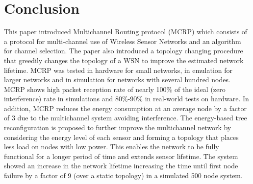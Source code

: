 \section{Conclusion}
\label{Conclusion}

This paper introduced Multichannel Routing protocol (MCRP) which consists of a protocol for multi-channel use of Wireless Sensor Networks and an algorithm for channel selection. The paper also introduced a topology changing procedure that greedily changes the topology of a WSN to improve the estimated network lifetime.  MCRP was tested in hardware for small networks, in emulation for larger networks and in simulation for networks with several hundred nodes.  MCRP shows high packet reception rate of nearly 100\% of the ideal (zero interference) rate in simulations and 80\%-90\% in real-world tests on hardware. In addition, MCRP reduces the energy consumption at an average node by a factor of 3 due to the multichannel system avoiding interference.  The energy-based tree reconfiguration is proposed to further improve the multichannel network by considering the energy level of each sensor and forming a topology that places less load on nodes with low power. 
This enables the network to be fully functional for a longer period of time and extends sensor lifetime.  The system showed an increase in the network lifetime increasing the time until first node failure by a factor of 9 (over a static topology) in a simulated 500 node system.
